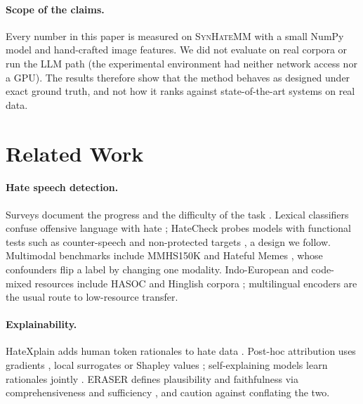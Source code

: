 \documentclass[11pt]{article}
\begin{document}
\paragraph{Scope of the claims.}
Every number in this paper is measured on \textsc{SynHateMM} with a small NumPy model and hand-crafted image features.
We did not evaluate on real corpora or run the LLM path (the experimental environment had neither network access nor a GPU).
The results therefore show that the method behaves as designed under exact ground truth, and not how it ranks against
state-of-the-art systems on real data.

\section{Related Work}
\paragraph{Hate speech detection.}
Surveys document the progress and the difficulty of the task \citep{schmidt2017survey,fortuna2018survey}. Lexical
classifiers confuse offensive language with hate \citep{davidson2017automated}; HateCheck probes models with
functional tests such as counter-speech and non-protected targets \citep{rottger2021hatecheck}, a design we follow.
Multimodal benchmarks include MMHS150K \citep{gomez2020mmhs} and Hateful Memes \citep{kiela2020hateful}, whose
confounders flip a label by changing one modality. Indo-European and code-mixed resources include HASOC \citep{mandl2019hasoc}
and Hinglish corpora \citep{bohra2018hinglish}; multilingual encoders \citep{conneau2020xlmr,khanuja2021muril} are the usual
route to low-resource transfer.

\paragraph{Explainability.}
HateXplain adds human token rationales to hate data \citep{mathew2021hatexplain}. Post-hoc attribution uses
gradients \citep{sundararajan2017ig}, local surrogates \citep{ribeiro2016lime} or Shapley values \citep{lundberg2017shap,shapley1953value};
self-explaining models learn rationales jointly \citep{lei2016rationalizing}. ERASER defines plausibility and faithfulness via
comprehensiveness and sufficiency \citep{deyoung2020eraser}, and \citet{jacovi2020faithfulness} caution against conflating the two.
\end{document}
